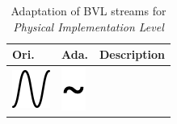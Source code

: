\begin{longtable}{|m{}|m{}|m{}|}
    \caption{Adaptation of BVL streams for \textit{Physical Implementation Level}} \label{tab:c4-bvl_physical_strem} \\
    \hline
    \textbf{Ori.} & \textbf{Ada.} & \textbf{Description} \\
    \hline
    \centering
    \includegraphics[width=0.75\linewidth]{chapters/4-MDC_model_application/image/bvl-audio-o.png}
    &
    \centering
    \includegraphics[width=0.75\linewidth]{chapters/4-MDC_model_application/image/bvl-audio.png}

\end{longtable}
